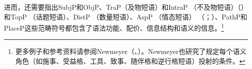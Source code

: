 进而，还需要指出SubjP和ObjP、TraP（及物短语）和IntraP （不及物短语）（\citealp[]{Karimi-Doostan2005a}）和TopP （话题短语）、DistP （数量短语）、AspP （情态短语） （\citealp[]{EKiss2003a-u}；\citealp[]{Karimi2005a}）、PathP和PlaceP\citep[]{Svenonius2004a-u}这些范畴符号都包含了语法功能、配价、信息结构和语义的信息。\footnote{%
更多例子和参考资料请参阅Newmeyer（\citeyear[]{Newmeyer2004b}、\citeyear[]{Newmeyer2005a}）。Newmeyer也研究了规定每个语义角色（如施事、受益格、工具、致事、随伴格和逆行格短语）投射的条件。
}
%

